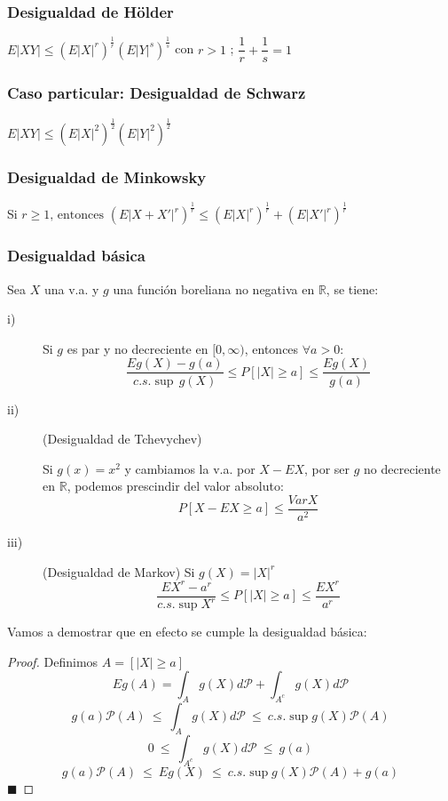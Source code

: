 \documentclass[12pt,a4paper]{book}
\newcommand*{\qed}{\hfill\ensuremath{\blacksquare}}
\begin{document}
\subsubsection{Desigualdad de Hölder}
$E|XY| \leq \left(E|X|^r \right)^{\frac{1}{r}}  \left(E|Y|^s \right)^{\frac{1}{s}}$ con $r>1$ ; $ \dfrac{1}{r}+\dfrac{1}{s}=1$

\subsubsection{Caso particular: Desigualdad de Schwarz}
$E|XY|\leq \left(E|X|^2 \right)^{\frac{1}{2}} \left(E|Y|^2 \right)^{\frac{1}{2}}$

\subsubsection{Desigualdad de Minkowsky}
Si $r \geq 1 \text{, entonces } (E|X+X'|^r)^{\frac{1}{r}} \leq \left(E|X|^r \right)^{\frac{1}{r}} + \left(E|X'|^r \right)^{\frac{1}{r}}$

\subsubsection{Desigualdad básica}
Sea $X$ una v.a. y $g$ una función boreliana no negativa en $\mathbb{R}$, se tiene:

\begin{description}
\item[i)] Si $g$ es par y no decreciente en $[0,\infty)$, entonces $\forall a>0$:
$$\dfrac{Eg(X)-g(a)}{c.s. \sup\, g(X)}\leq P[|X|\geq a]\leq \dfrac{E g(X)}{g(a)}$$
\item[ii)] (Desigualdad de Tchevychev) 

Si $g(x)=x^2$ y cambiamos la v.a. por $X-EX$, por ser $g$ no decreciente en $\mathbb{R}$, podemos prescindir del valor absoluto:
$$ P[X-EX \geq a] \leq \frac{Var X}{a^2}$$
\item[iii)] (Desigualdad de Markov) Si $g(X) = |X|^r$
$$ \frac{EX^r - a^r}{c.s.\sup X^r} \leq P[|X| \geq a] \leq \frac{EX^r}{a^r} $$
\end{description}

Vamos a demostrar que en efecto se cumple la desigualdad básica:
\begin{proof}
Definimos $A = [|X| \geq a]$
$$ Eg(A) = \int_A g(X) d\mathcal{P} + \int_{A^c} g(X) d\mathcal{P} $$
$$ g(a)\mathcal{P}(A)\ \leq\ \int_A g(X)d\mathcal{P} \ \leq \ c.s.\sup g(X)\mathcal{P}(A) $$
$$ 0 \ \leq \ \int_{A^c} g(X) d\mathcal{P} \ \leq \ g(a) $$
$$ g(a)\mathcal{P}(A) \ \leq\ Eg(X) \ \leq \ c.s.\sup g(X)\mathcal{P}(A) + g(a) $$
\qed
\end{proof}
\end{document}
